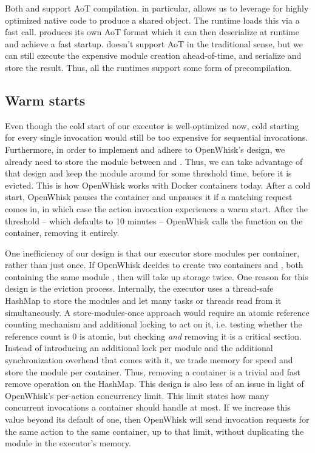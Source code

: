 Both  and  support AoT compilation.  in particular, allows us to leverage  for highly optimized native code to produce a shared object. The runtime loads this via a fast  call.  produces its own AoT format which it can then deserialize at runtime and achieve a fast startup.  doesn't support AoT in the traditional sense, but we can still execute the expensive module creation ahead-of-time, and serialize and store the result. Thus, all the runtimes support some form of precompilation.

\subsection{Warm starts}

Even though the cold start of our executor is well-optimized now, cold starting for every single invocation would still be too expensive for sequential invocations. Furthermore, in order to implement and adhere to OpenWhisk's design, we already need to store the module between  and . Thus, we can take advantage of that design and keep the module around for some threshold time, before it is evicted. This is how OpenWhisk works with Docker containers today. After a cold start, OpenWhisk pauses the container and unpauses it if a matching request comes in, in which case the action invocation experiences a warm start. After the threshold -- which defaults to 10 minutes -- OpenWhisk calls the  function on the container, removing it entirely.

One inefficiency of our design is that our executor store modules per container, rather than just once. If OpenWhisk decides to create two containers  and , both containing the same module , then  will take up storage twice. One reason for this design is the eviction process. Internally, the executor uses a thread-safe HashMap to store the modules and let many tasks or threads read from it simultaneously. A store-modules-once approach would require an atomic reference counting mechanism and additional locking to act on it, i.e. testing whether the reference count is 0 is atomic, but checking \emph{and} removing it is a critical section. Instead of introducing an additional lock per module and the additional synchronization overhead that comes with it, we trade memory for speed and store the module per container. Thus, removing a container is a trivial and fast remove operation on the HashMap. This design is also less of an issue in light of OpenWhisk's per-action concurrency limit. This limit states how many concurrent invocations a container should handle at most. If we increase this value beyond its default of one, then OpenWhisk will send invocation requests for the same action to the same container, up to that limit, without duplicating the module in the executor's memory.

